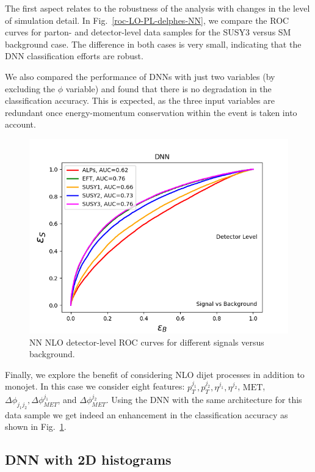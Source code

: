 \documentclass[prd,aps,letterpaper,floatfix,superscriptaddress,preprintnumbers,twocolumn,10pt,nofootinbib]{revtex4-1}
\begin{document}
The first aspect relates to the robustness of the analysis with changes in the level of simulation detail. In Fig.~\ref{roc-LO-PL-delphes-NN}, we compare
the ROC curves for parton- and detector-level data samples for the SUSY3 versus SM background case. The difference in both cases is very small, indicating that the DNN classification efforts are robust. 

We also compared the performance of DNNs  with just two variables (by excluding the $\phi$ variable) and found that there is no degradation in the classification accuracy. This is expected, as the three input variables are redundant once energy-momentum conservation within the event is taken into account. 
\begin{figure}%
\centering
\includegraphics[scale=0.50]{figures/ROCsbNNdelphesNLO.png}
\caption{NN NLO detector-level ROC curves for different signals versus background. 
 }\label{roc-NLOdelphes-NN}
\end{figure}
Finally, we explore the benefit of considering  NLO dijet  processes in addition to monojet.  In this case we consider eight features: $p_T^{j_1}, p_T^{j_2}, \eta^{j_1}, \eta^{j_2}$, $\text{MET}$, $\Delta \phi_{j_1j_2}, 
\Delta \phi_{MET}^{j_1}$, and  $\Delta \phi_{MET}^{j_2}$. Using the DNN with the same architecture for this data sample we get indeed an enhancement in the classification accuracy as shown in Fig.~\ref{roc-NLOdelphes-NN}.




\subsection{DNN with 2D histograms}
\end{document}
